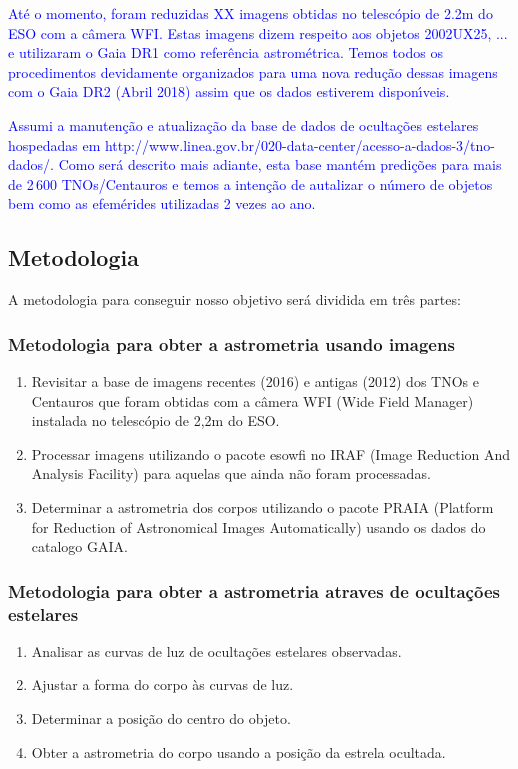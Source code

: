 \documentclass[a4paper, 11pt]{article}
\begin{document}
\textcolor{blue}{At\'e o momento, foram reduzidas XX imagens obtidas no telesc\'opio de 2.2m do ESO com a c\^amera WFI. Estas imagens dizem respeito aos objetos 2002UX25, ... e utilizaram o Gaia DR1 como refer\^encia astrom\'etrica. Temos todos os procedimentos devidamente organizados para uma nova redu\c c\~ao dessas imagens com o Gaia DR2 (Abril 2018) assim que os dados estiverem dispon\'{\i}veis.}

\textcolor{blue}{Assumi a manuten\c c\~ao e atualiza\c c\~ao da base de dados de oculta\c c\~oes estelares hospedadas em http://www.linea.gov.br/020-data-center/acesso-a-dados-3/tno-dados/. Como ser\'a descrito mais adiante, esta base mant\'em predi\c c\~oes para mais de 2\,600 TNOs/Centauros e temos a inten\c c\~ao de autalizar o n\'umero de objetos bem como as efem\'erides utilizadas 2 vezes ao ano.}

\newpage     
\subsection{Metodologia}

A metodologia para conseguir nosso objetivo será dividida em três partes:

\subsubsection{Metodologia para obter a astrometria usando imagens}
\begin{enumerate}
  \item Revisitar a base de imagens recentes (2016) e antigas (2012) dos TNOs e Centauros que foram obtidas com a câmera WFI (Wide Field Manager) instalada no telescópio de 2,2m do ESO.
  \item Processar imagens utilizando o pacote esowfi no IRAF (Image Reduction And Analysis Facility) para aquelas que ainda não foram processadas.
  \item Determinar a astrometria dos corpos utilizando o pacote PRAIA (Platform for Reduction of Astronomical Images Automatically) usando os dados do catalogo GAIA.
\end{enumerate}

\subsubsection{Metodologia para obter a astrometria atraves de ocultações estelares}
\begin{enumerate}
  \item Analisar as curvas de luz de ocultações estelares observadas.
  \item Ajustar a forma do corpo às curvas de luz.
  \item Determinar a posição do centro do objeto.
  \item Obter a astrometria do corpo usando a posição da estrela ocultada.
\end{enumerate}
\end{document}
